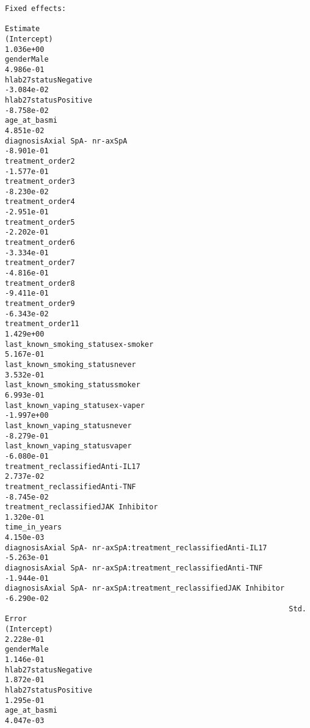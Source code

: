 \documentclass[
  letterpaper,
  DIV=11,
  numbers=noendperiod]{scrartcl}
\begin{document}
\begin{verbatim}
Fixed effects:
                                                                   Estimate
(Intercept)                                                       1.036e+00
genderMale                                                        4.986e-01
hlab27statusNegative                                             -3.084e-02
hlab27statusPositive                                             -8.758e-02
age_at_basmi                                                      4.851e-02
diagnosisAxial SpA- nr-axSpA                                     -8.901e-01
treatment_order2                                                 -1.577e-01
treatment_order3                                                 -8.230e-02
treatment_order4                                                 -2.951e-01
treatment_order5                                                 -2.202e-01
treatment_order6                                                 -3.334e-01
treatment_order7                                                 -4.816e-01
treatment_order8                                                 -9.411e-01
treatment_order9                                                 -6.343e-02
treatment_order11                                                 1.429e+00
last_known_smoking_statusex-smoker                                5.167e-01
last_known_smoking_statusnever                                    3.532e-01
last_known_smoking_statussmoker                                   6.993e-01
last_known_vaping_statusex-vaper                                 -1.997e+00
last_known_vaping_statusnever                                    -8.279e-01
last_known_vaping_statusvaper                                    -6.080e-01
treatment_reclassifiedAnti-IL17                                   2.737e-02
treatment_reclassifiedAnti-TNF                                   -8.745e-02
treatment_reclassifiedJAK Inhibitor                               1.320e-01
time_in_years                                                     4.150e-03
diagnosisAxial SpA- nr-axSpA:treatment_reclassifiedAnti-IL17     -5.263e-01
diagnosisAxial SpA- nr-axSpA:treatment_reclassifiedAnti-TNF      -1.944e-01
diagnosisAxial SpA- nr-axSpA:treatment_reclassifiedJAK Inhibitor -6.290e-02
                                                                 Std. Error
(Intercept)                                                       2.228e-01
genderMale                                                        1.146e-01
hlab27statusNegative                                              1.872e-01
hlab27statusPositive                                              1.295e-01
age_at_basmi                                                      4.047e-03

\end{verbatim}
\end{document}
